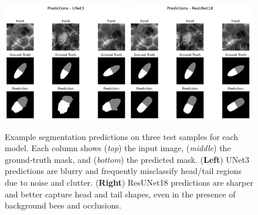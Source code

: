 \begin{figure}[htbp]
    \centering
    \includegraphics[width=0.49\textwidth]{figures/results/2 - segmentation performance/UNet3 Prediction Masks.png}
    \hfill
    \includegraphics[width=0.49\textwidth]{figures/results/2 - segmentation performance/ResUNet18 Prediction Masks.png}
    \caption{
        Example segmentation predictions on three test samples for each model.
        Each column shows (\textit{top}) the input image, (\textit{middle}) the ground‑truth mask, and (\textit{bottom}) the predicted mask.
        (\textbf{Left}) UNet3 predictions are blurry and frequently misclassify head/tail regions due to noise and clutter.
        (\textbf{Right}) ResUNet18 predictions are sharper and better capture head and tail shapes, even in the presence of background bees and occlusions.
    }
    \label{fig:segmentation_predictions}
\end{figure}